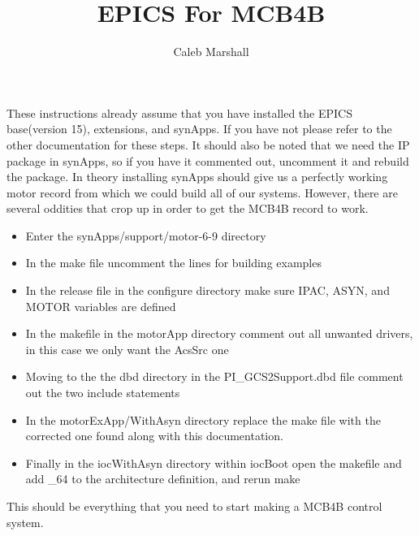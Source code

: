 \documentclass{article}
\begin{document}
 



\title{EPICS For MCB4B}
\date{}
\author{Caleb Marshall}
\maketitle

  These instructions already assume that you have installed the EPICS base(version 15), extensions, and synApps. If you have not please refer to
the other documentation for these steps. It should also be noted that we need the IP package in synApps, so if you have it commented out, uncomment it and 
rebuild the package. In theory installing synApps should give us a perfectly working motor record from which we could build all of our systems. However, 
there are several oddities that crop up in order to get the MCB4B record to work. 


 
\begin{itemize}
  \item Enter the synApps/support/motor-6-9 directory
  \item In the make file uncomment the lines for building examples
  \item In the release file in the configure directory make sure IPAC, ASYN, and MOTOR variables are defined
  \item In the makefile in the motorApp directory comment out all unwanted drivers, in this case we only want the AcsSrc one
  \item Moving to the the dbd directory in the PI\_GCS2Support.dbd file comment out the two include statements
  \item In the motorExApp/WithAsyn directory replace the make file with the corrected one found along with this documentation.
  \item Finally in the iocWithAsyn directory within iocBoot open the makefile and add \_64 to the architecture definition, and rerun make 
\end{itemize}  
  

This should be everything that you need to start making a MCB4B control system.
 
 

 
 
\end{document}
